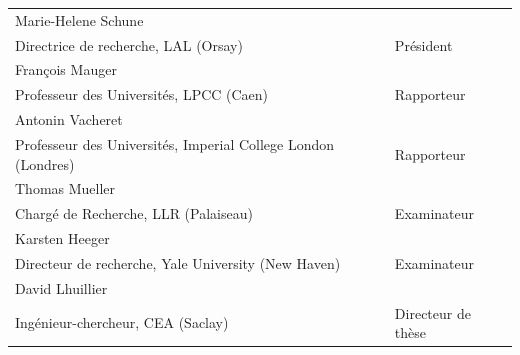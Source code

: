 \documentclass[a4paper]{article}
\newcommand{\jurynameA}{Marie-Helene Schune}
\newcommand{\juryadressA}{Directrice de recherche, LAL (Orsay)}
\newcommand{\juryroleA}{Président}
\newcommand{\jurynameB}{François Mauger}
\newcommand{\juryadressB}{Professeur des Universités, LPCC (Caen)}
\newcommand{\juryroleB}{Rapporteur}
\newcommand{\jurynameC}{Antonin Vacheret}
\newcommand{\juryadressC}{Professeur des Universités, Imperial College London (Londres)}
\newcommand{\juryroleC}{Rapporteur}
\newcommand{\jurynameD}{Thomas Mueller}
\newcommand{\juryadressD}{Chargé de Recherche, LLR (Palaiseau)}
\newcommand{\juryroleD}{Examinateur}
\newcommand{\jurynameE}{Karsten Heeger}
\newcommand{\juryadressE}{Directeur de recherche, Yale University (New Haven)}
\newcommand{\juryroleE}{Examinateur}
\newcommand{\jurynameF}{David Lhuillier}
\newcommand{\juryadressF}{Ingénieur-chercheur, CEA (Saclay)}
\newcommand{\juryroleF}{Directeur de thèse}
\begin{document}
\begin{textblock}{10.3}
	\label{jury} 																				%
	\begin{flushleft}
	\begin{tabular}{@{} L{9.5cm} R{4.5cm}}
		\jurynameA  \\ \juryadressA & \juryroleA \\[5pt]
		\jurynameB  \\ \juryadressB & \juryroleB \\[5pt]
		\jurynameC  \\ \juryadressC & \juryroleC \\[5pt]
		\jurynameD  \\ \juryadressD & \juryroleD \\[5pt]
		\jurynameE  \\ \juryadressE & \juryroleE \\[5pt]
		\jurynameF  \\ \juryadressF & \juryroleF \\[5pt]
	\end{tabular} 
	\end{flushleft}   
\end{textblock}
\end{document}
